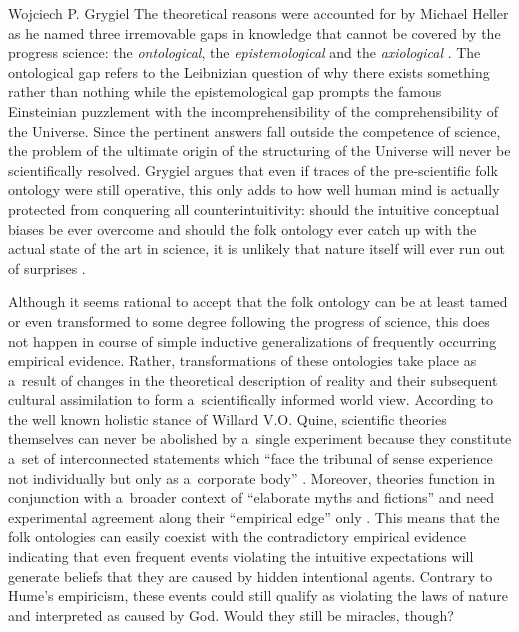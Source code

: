\begin{artengenv}{Wojciech P. Grygiel}
The theoretical reasons were accounted for by Michael Heller as he named three irremovable gaps in knowledge that cannot be covered by the progress science: the \textit{ontological}, the \textit{epistemological} and the \textit{axiological}
\parencite[][pp.142–143]{heller_chaos_2003}. %
 The ontological gap refers to the Leibnizian question of why there exists something rather than nothing while the epistemological gap prompts the famous Einsteinian puzzlement with the incomprehensibility of the comprehensibility of the Universe. Since the pertinent answers fall outside the competence of science, the problem of the ultimate origin of the structuring of the Universe will never be scientifically resolved. Grygiel argues that even if traces of the pre-scientific folk ontology were still operative, this only adds to how well human mind is actually protected from conquering all counterintuitivity: should the intuitive conceptual biases be ever overcome and should the folk ontology ever catch up with the actual state of the art in science, it is unlikely that nature itself will ever run out of surprises 
\parencite[][]{grygiel_science_2017}.%


Although it seems rational to accept that the folk ontology can be at least tamed or even transformed to some degree following the progress of science, this does not happen in course of simple inductive generalizations of frequently occurring empirical evidence. Rather, transformations of these ontologies take place as a~result of changes in the theoretical description of reality and their subsequent cultural assimilation to form a~scientifically informed world view. According to the well known holistic stance of Willard V.O. Quine, scientific theories themselves can never be abolished by a~single experiment because they constitute a~set of interconnected statements which ``face the tribunal of sense experience not individually but only as a~corporate body''
\parencite[][p.30]{Quine1951-QUITDO-3}. %
 Moreover, theories function in conjunction with a~broader context of ``elaborate myths and fictions'' and need experimental agreement along their ``empirical edge'' only 
\parencite[][p.42]{Quine1951-QUITDO-3}. %
 This means that the folk ontologies can easily coexist with the contradictory empirical evidence indicating that even frequent events violating the intuitive expectations will generate beliefs that they are caused by hidden intentional agents. Contrary to Hume’s empiricism, these events could still qualify as violating the laws of nature and interpreted as caused by God. Would they still be miracles, though?


\end{artengenv}

